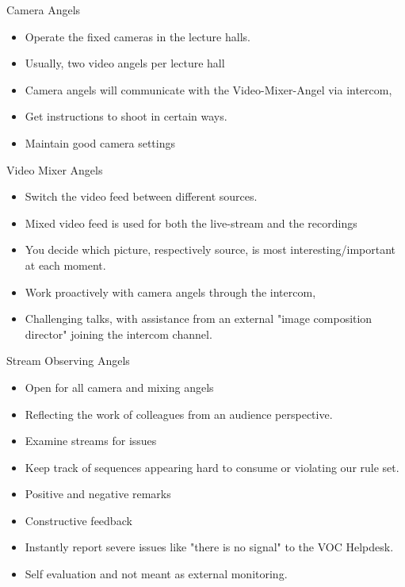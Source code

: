 \documentclass[aspectratio=169]{beamer}
\begin{document}
\begin{frame}{Camera Angels}
	\begin{itemize}
		\item Operate the fixed cameras in the lecture halls. 
		\item Usually, two video angels per lecture hall 
		\item Camera angels will communicate with the Video-Mixer-Angel via intercom,
		\item Get instructions to shoot in certain ways. 
		\item Maintain good camera settings 
	\end{itemize}
\end{frame}

\begin{frame}{Video Mixer Angels}
	\begin{itemize}
		\item Switch the video feed between different sources. 
		\item Mixed video feed is used for both the live-stream and the recordings 
		\item You decide which picture, respectively source, is most interesting/important at each moment.
		\item Work proactively with camera angels through the intercom, 
		\item Challenging talks, with assistance from an external "image composition director" joining the intercom channel.
	\end{itemize}
\end{frame}

\begin{frame}{Stream Observing Angels}
	\begin{itemize}
		\item Open for all camera and mixing angels
		\item Reflecting the work of colleagues from an audience perspective.
		\item Examine streams for issues 
		\item Keep track of sequences appearing hard to consume or violating our rule set. 
		\item Positive and negative remarks 
		\item Constructive feedback 
		\item Instantly report severe issues like "there is no signal" to the VOC Helpdesk.
		\item Self evaluation and not meant as external monitoring. 
	\end{itemize}
\end{frame}
\end{document}
